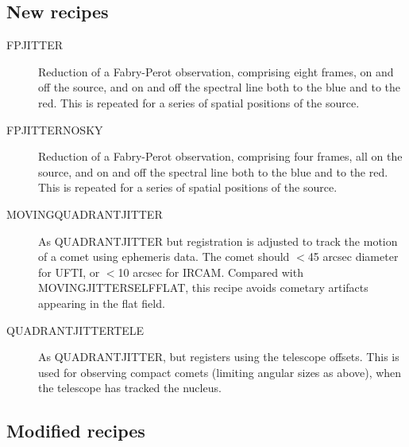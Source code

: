 \documentclass[twoside,11pt]{article}
\newcommand{\htmlref}[2]{#1}
\renewcommand{\_}{\texttt{\symbol{95}}}
\begin{document}
\subsection{New recipes}
\begin{description}
   \item [\htmlref{FP\_JITTER}{FP\_JITTER}]
      Reduction of a Fabry-Perot observation, comprising eight frames,
      on and off the source, and on and off the spectral line both to
      the blue and to the red.  This is repeated for a series of spatial
      positions of the source.
   \item [\htmlref{FP\_JITTER\_NO\_SKY}{FP\_JITTER\_NO\_SKY}]
      Reduction of a Fabry-Perot observation, comprising four frames,
      all on the source, and on and off the spectral line both to
      the blue and to the red.  This is repeated for a series of spatial
      positions of the source.
   \item [\htmlref{MOVING\_QUADRANT\_JITTER}{MOVING\_QUADRANT\_JITTER}]
      As \htmlref{QUADRANT\_JITTER}{QUADRANT\_JITTER} but registration
      is adjusted to track the motion of a comet using ephemeris
      data.  The comet should $<$45 arcsec diameter for UFTI, or $<$10
      arcsec for IRCAM.  Compared with 
      \htmlref{MOVING\_JITTER\_SELF\_FLAT}{MOVING\_JITTER\_SELF\_FLAT}, 
      this recipe avoids cometary artifacts appearing in the flat field.
   \item [\htmlref{QUADRANT\_JITTER\_TELE}{QUADRANT\_JITTER\_TELE}]
      As QUADRANT\_JITTER, but registers using the telescope offsets.
      This is used for observing compact comets (limiting angular
      sizes as above), when the telescope has tracked the
      nucleus.
\end{description}

\subsection{Modified recipes}
\end{document}
